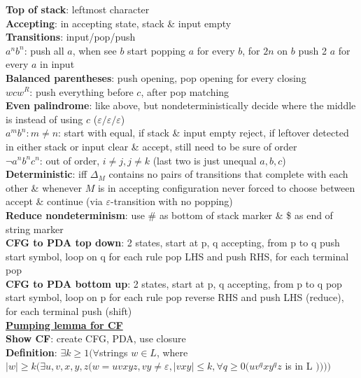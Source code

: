 \documentclass[a4paper]{article}
\begin{document}
\begin{multicols}{2}
        \textbf{Top of stack}: leftmost character\\
        \textbf{Accepting}: in accepting state, stack \& input empty\\
        \textbf{Transitions}: input/pop/push\\
        \boldmath$a^n b^n$\unboldmath: push all $a$, when see $b$ start popping $a$ for every $b$, for $2n$ on $b$ push 2 $a$ for every $a$ in input\\
        \textbf{Balanced parentheses}: push opening, pop opening for every closing\\
        \boldmath$wc w^R$\unboldmath: push everything before $c$, after pop matching\\
        \textbf{Even palindrome}: like above, but nondeterministically decide where the middle is instead of using $c$ ($\varepsilon/\varepsilon/\varepsilon$)\\
        \boldmath$a^m b^n: m \neq n$\unboldmath: start with equal, if stack \& input empty reject, if leftover detected in either stack or input clear \& accept, still need to be sure of order\\
        \boldmath$\neg a^n b^n c^n$\unboldmath: out of order, $i \neq j, j \neq k$ (last two is just unequal $a, b, c$)\\
        \textbf{Deterministic}: iff $\Delta_M$ contains no pairs of transitions that complete with each other \& whenever $M$ is in accepting configuration never forced to choose between accept \& continue (via $\varepsilon$-transition with no popping)\\
        \textbf{Reduce nondeterminism}: use \# as bottom of stack marker \& \$ as end of string marker\\
        \textbf{CFG to PDA top down}: 2 states, start at p, q accepting, from p to q push start symbol, loop on q for each rule pop LHS and push RHS, for each terminal pop\\
        \textbf{CFG to PDA bottom up}: 2 states, start at p, q accepting, from p to q pop start symbol, loop on p for each rule pop reverse RHS and push LHS (reduce), for each terminal push (shift)\\
        \underline{\textbf{Pumping lemma for CF}}\\
        \textbf{Show CF}: create CFG, PDA, use closure\\
        \textbf{Definition}: $\exists k \geq 1 (\forall $strings $w \in L$, where $|w| \geq k (\exists u, v, x, y, z (w = uvxyz, vy \neq \varepsilon, |vxy| \leq k, \forall q \geq 0 (u v^q x y^q z$ is in L $))))$\\

\end{multicols}
\end{document}
